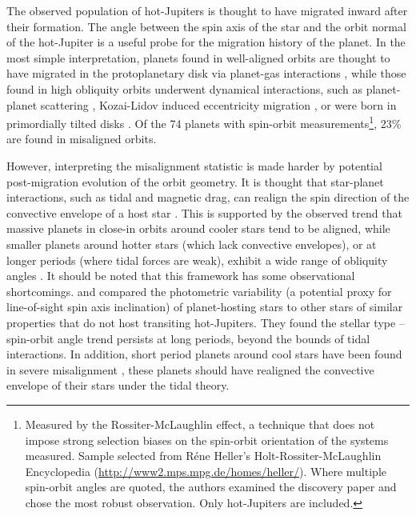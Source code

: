 \documentclass[useAMS,usenatbib]{mn2e}
\begin{document}
The observed population of hot-Jupiters is thought to have migrated inward after their formation. The angle between the spin axis of the star and the orbit normal of the hot-Jupiter is a useful probe for the migration history of the planet. In the most simple interpretation, planets found in well-aligned orbits are thought to have migrated in the protoplanetary disk via planet-gas interactions \citep[e.g.][]{1996Natur.380..606L}, while those found in high obliquity orbits underwent dynamical interactions, such as planet-planet scattering \citep[e.g.][]{1996Sci...274..954R}, Kozai-Lidov induced eccentricity migration \citep[e.g.][]{2003ApJ...589..605W,2007ApJ...669.1298F}, or were born in primordially tilted disks \citep[e.g.][]{2010MNRAS.401.1505B,2012Natur.491..418B}.  Of the 74 planets with  spin-orbit measurements\footnote{Measured by the Rossiter-McLaughlin effect, a technique that does not impose strong selection biases on the spin-orbit orientation of the systems measured. Sample selected from R\'{e}ne Heller's Holt-Rossiter-McLaughlin Encyclopedia (\url{http://www2.mps.mpg.de/homes/heller/}). Where multiple spin-orbit angles are quoted, the authors examined the discovery paper and chose the most robust observation. Only hot-Jupiters are included.}, 23\% are found in misaligned orbits.

However, interpreting the misalignment statistic is made harder by potential post-migration evolution of the orbit geometry. It is thought that star-planet interactions, such as tidal and magnetic drag, can realign the spin direction of the convective envelope of a host star \citep{2010ApJ...718L.145W,2012MNRAS.423..486L,2013ApJ...769L..10R,2014ApJ...784...66X,2014ApJ...790L..31D}. This is supported by the observed trend that massive planets in close-in orbits around cooler stars tend to be aligned, while smaller planets around hotter stars (which lack convective envelopes), or at longer periods (where tidal forces are weak), exhibit a wide range of obliquity angles \citep[e.g.][]{2010ApJ...718L.145W,2010ApJ...719..602S,2012ApJ...757...18A,2015ApJ...801....3M}.  It should be noted that this framework has some observational shortcomings. \citet{2015ApJ...801....3M} and \citet{2015arXiv151105570L} compared the photometric variability (a potential proxy for line-of-sight spin axis inclination) of planet-hosting stars to other stars of similar properties that do not host transiting hot-Jupiters. They found the stellar type -- spin-orbit angle trend persists at long periods, beyond the bounds of tidal interactions. In addition, short period planets around cool stars have been found in severe misalignment \citep{2010MNRAS.402L...1P,2015ApJ...814L..16Z}, these planets should have realigned the convective envelope of their stars under the tidal theory.
\end{document}

